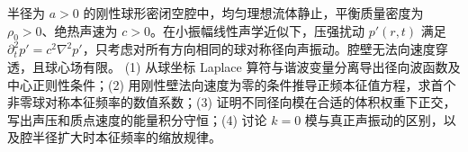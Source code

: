 半径为 \(a>0\) 的刚性球形密闭空腔中，均匀理想流体静止，平衡质量密度为 \(\rho_0>0\)、绝热声速为 \(c>0\)。在小振幅线性声学近似下，压强扰动 \(p'(r,t)\) 满足 \(\partial_t^2 p'=c^2\nabla^2p'\)，只考虑对所有方向相同的球对称径向声振动。腔壁无法向速度穿透，且球心场有限。
(1) 从球坐标 Laplace 算符与谐波变量分离导出径向波函数及中心正则性条件；(2) 用刚性壁法向速度为零的条件推导正频本征值方程，求首个非零球对称本征频率的数值系数；(3) 证明不同径向模在合适的体积权重下正交，写出声压和质点速度的能量积分守恒；(4) 讨论 \(k=0\) 模与真正声振动的区别，以及腔半径扩大时本征频率的缩放规律。

